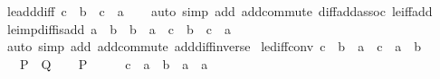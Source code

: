 \begin{isabellebody}
\endisatagproof
{\isafoldproof}%
%
\isadelimproof
\isanewline
%
\endisadelimproof
\isanewline
{}\isamarkupfalse%
\ le{\isacharunderscore}{\kern0pt}add{\isacharunderscore}{\kern0pt}diff{\isacharcolon}{\kern0pt}\ {\isachardoublequoteopen}c\ {\isasymle}\ b\ {\isacharplus}{\kern0pt}\ c\ {\isacharminus}{\kern0pt}\ a{\isachardoublequoteclose}\isanewline
%
\isadelimproof
\ \ %
\endisadelimproof
%
\isatagproof
{}\isamarkupfalse%
\ {\isacharparenleft}{\kern0pt}auto\ simp\ add{\isacharcolon}{\kern0pt}\ add{\isachardot}{\kern0pt}commute\ diff{\isacharunderscore}{\kern0pt}add{\isacharunderscore}{\kern0pt}assoc{}\ le{\isacharunderscore}{\kern0pt}iff{\isacharunderscore}{\kern0pt}add{\isacharparenright}{\kern0pt}%
\endisatagproof
{\isafoldproof}%
%
\isadelimproof
\isanewline
%
\endisadelimproof
\isanewline
{}\isamarkupfalse%
\ le{\isacharunderscore}{\kern0pt}imp{\isacharunderscore}{\kern0pt}diff{\isacharunderscore}{\kern0pt}is{\isacharunderscore}{\kern0pt}add{\isacharcolon}{\kern0pt}\ {\isachardoublequoteopen}a\ {\isasymle}\ b\ {\isasymLongrightarrow}\ b\ {\isacharminus}{\kern0pt}\ a\ {\isacharequal}{\kern0pt}\ c\ {\isasymlongleftrightarrow}\ b\ {\isacharequal}{\kern0pt}\ c\ {\isacharplus}{\kern0pt}\ a{\isachardoublequoteclose}\isanewline
%
\isadelimproof
\ \ %
\endisadelimproof
%
\isatagproof
{}\isamarkupfalse%
\ {\isacharparenleft}{\kern0pt}auto\ simp\ add{\isacharcolon}{\kern0pt}\ add{\isachardot}{\kern0pt}commute\ add{\isacharunderscore}{\kern0pt}diff{\isacharunderscore}{\kern0pt}inverse{\isacharparenright}{\kern0pt}%
\endisatagproof
{\isafoldproof}%
%
\isadelimproof
\isanewline
%
\endisadelimproof
\isanewline
{}\isamarkupfalse%
\ le{\isacharunderscore}{\kern0pt}diff{\isacharunderscore}{\kern0pt}conv{}{\isacharcolon}{\kern0pt}\ {\isachardoublequoteopen}c\ {\isasymle}\ b\ {\isacharminus}{\kern0pt}\ a\ {\isasymlongleftrightarrow}\ c\ {\isacharplus}{\kern0pt}\ a\ {\isasymle}\ b{\isachardoublequoteclose}\isanewline
\ \ {\isacharparenleft}{\kern0pt}\ {\isachardoublequoteopen}{\isacharquery}{\kern0pt}P\ {\isasymlongleftrightarrow}\ {\isacharquery}{\kern0pt}Q{\isachardoublequoteclose}{\isacharparenright}{\kern0pt}\isanewline
%
\isadelimproof
%
\endisadelimproof
%
\isatagproof
{}\isamarkupfalse%
\isanewline
\ \ \isamarkupfalse%
\ {\isacharquery}{\kern0pt}P\isanewline
\ \ \isamarkupfalse%
\ \isamarkupfalse%
\ {\isachardoublequoteopen}c\ {\isacharplus}{\kern0pt}\ a\ {\isasymle}\ b\ {\isacharminus}{\kern0pt}\ a\ {\isacharplus}{\kern0pt}\ a{\isachardoublequoteclose}\isanewline

\end{isabellebody}
